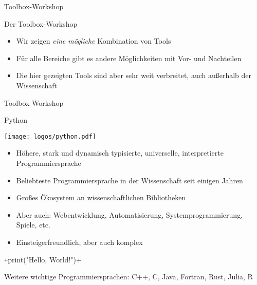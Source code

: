 \begin{frame}{Toolbox-Workshop}
  \begin{center}
    \textcolor{vertexDarkRed}{\Huge Der Toolbox-Workshop}\\[\baselineskip]
    \begin{itemize}
      \item Wir zeigen \emph{eine mögliche} Kombination von Tools 
      \item Für alle Bereiche gibt es andere Möglichkeiten mit Vor- und Nachteilen
      \item Die hier gezeigten Tools sind aber sehr weit verbreitet, auch außerhalb der Wissenschaft
    \end{itemize}
  \end{center}
\end{frame}


\begin{frame}
  \vspace*{1cm}
  \begin{center}
    \Huge Toolbox Workshop
  \end{center}
\end{frame}


\begin{frame}[fragile]{Python}
  \begin{center}
      \texttt{[image: logos/python.pdf]}%
  \end{center}

  \begin{itemize}
    \item Höhere, stark und dynamisch typisierte, universelle, interpretierte Programmiersprache
    \item Beliebteste Programmiersprache in der Wissenschaft seit einigen Jahren
    \item Großes Ökosystem an wissenschaftlichen Bibliotheken
    \item Aber auch: Webentwicklung, Automatisierung, Systemprogrammierung, Spiele, etc.
    \item Einsteigerfreundlich, aber auch komplex
  \end{itemize}

  \begin{center}
    \texttt+print("Hello, World!")+
  \end{center}

  Weitere wichtige Programmiersprachen: C++, C, Java, Fortran, Rust, Julia, R
\end{frame}



